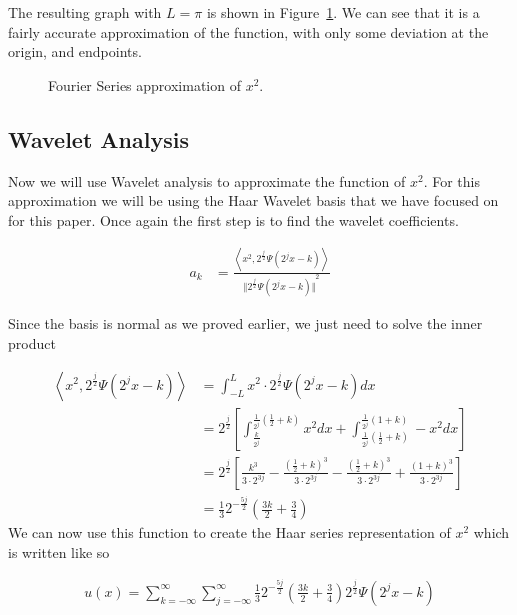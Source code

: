 \documentclass[12pt]{amsart}
\begin{document}
The resulting graph with $L=\pi$ is shown in Figure~\ref{fig:fourier_approx}. We can see that it is a fairly accurate approximation of the function, with only some deviation at the origin, and endpoints.

\begin{figure}
\centering

\caption{\label{fig:fourier_approx}Fourier Series approximation of $x^2$.}
\end{figure}

\subsection{Wavelet Analysis}%
\label{sub:wavelet_analysis}

Now we will use Wavelet analysis to approximate the function of $x^2$. For this approximation we will be using the Haar Wavelet basis that we have focused on for this paper. Once again the first step is to find the wavelet coefficients.

\begin{align}
	a_k&=\frac{\left<x^2,2^\frac{j}{2}\Psi\left(2^jx-k\right)\right>}{{\Vert 2^\frac{j}{2}\Psi\left(2^jx-k\right)\Vert}^2}
\end{align}

Since the basis is normal as we proved earlier, we just need to solve the inner product

\begin{align}
	\left<x^2,2^\frac{j}{2}\Psi\left(2^jx-k\right)\right> &= \int_{-L}^{L}x^2\cdot 2^\frac{j}{2}\Psi\left(2^jx-k\right)dx\\
	&=2^\frac{j}{2}\left[\int_{\frac{k}{2^j}}^{\frac{1}{2^j}\left(\frac{1}{2}+k\right)}x^2dx+\int_{\frac{1}{2^j}\left(\frac{1}{2}+k\right)}^{\frac{1}{2^j}\left(1+k\right)}-x^2dx\right]\\
	&= 2^\frac{j}{2}\left[\frac{k^3}{3\cdot 2^{3j}}-\frac{\left(\frac{1}{2}+k\right)^3}{3\cdot 2^{3j}}-\frac{\left(\frac{1}{2}+k\right)^3}{3\cdot 2^{3j}}+\frac{\left(1+k\right)^3}{3\cdot 2^{3j}}\right]\\
	&=\frac{1}{3}2^{-\frac{5j}{2}}\left(\frac{3k}{2}+\frac{3}{4}\right)
\end{align}
We can now use this function to create the Haar series representation of $x^2$ which is written like so

\begin{align}
	u(x)=\sum_{k=-\infty}^{\infty}\sum_{j=-\infty}^{\infty}\frac{1}{3}2^{-\frac{5j}{2}}\left(\frac{3k}{2}+\frac{3}{4}\right)2^\frac{j}{2}\Psi\left(2^jx-k\right)
\end{align}
\end{document}
